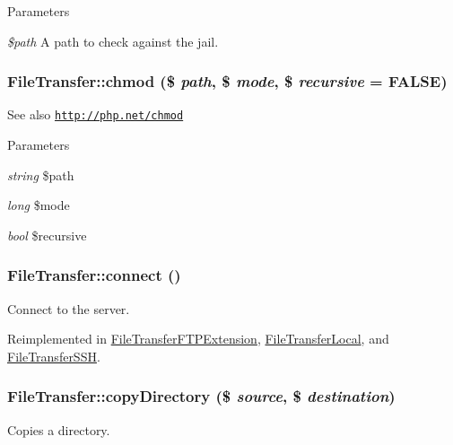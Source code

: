 \begin{DoxyParams}{Parameters}
\item[{\em \$path}]A path to check against the jail. \end{DoxyParams}
\hypertarget{classFileTransfer_a7c49554b3cce3ab7cc03e2f45f9934b1}{
\subsubsection[{chmod}]{\setlength{\rightskip}{0pt plus 5cm}FileTransfer::chmod (\$ {\em path}, \/  \$ {\em mode}, \/  \$ {\em recursive} = {\ttfamily FALSE})}}
\label{classFileTransfer_a7c49554b3cce3ab7cc03e2f45f9934b1}
\begin{DoxySeeAlso}{See also}
\href{http://php.net/chmod}{\tt http://php.net/chmod}
\end{DoxySeeAlso}

\begin{DoxyParams}{Parameters}
\item[{\em string}]\$path \item[{\em long}]\$mode \item[{\em bool}]\$recursive \end{DoxyParams}
\hypertarget{classFileTransfer_a78b9b9fdd3029295f73a5a41e052e311}{
\subsubsection[{connect}]{\setlength{\rightskip}{0pt plus 5cm}FileTransfer::connect ()}}
\label{classFileTransfer_a78b9b9fdd3029295f73a5a41e052e311}
Connect to the server. 

Reimplemented in \hyperlink{classFileTransferFTPExtension_ad79d4e7e3f1c9800f30edb387e358f22}{FileTransferFTPExtension}, \hyperlink{classFileTransferLocal_a676f0b89d8271d716a05cd92b55dfa60}{FileTransferLocal}, and \hyperlink{classFileTransferSSH_a3b153dcb920f531962fc4d4339683be8}{FileTransferSSH}.\hypertarget{classFileTransfer_a85afa98d3b1e04536d298d23bf8c0ceb}{
\subsubsection[{copyDirectory}]{\setlength{\rightskip}{0pt plus 5cm}FileTransfer::copyDirectory (\$ {\em source}, \/  \$ {\em destination})}}
\label{classFileTransfer_a85afa98d3b1e04536d298d23bf8c0ceb}
Copies a directory.


